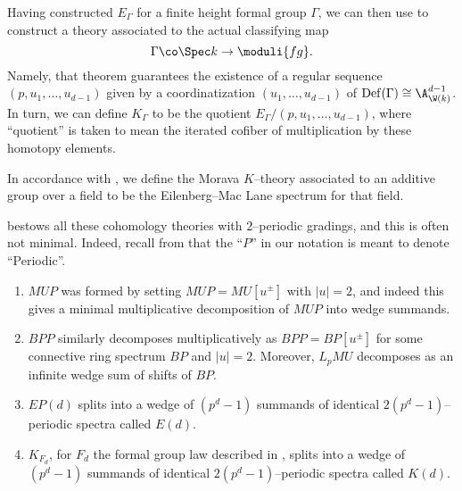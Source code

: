 \begin{example}\label{DefnKThy}
Having constructed $E_\Gamma$ for a finite height formal group $\Gamma$, we can then use  to construct a theory associated to the actual classifying map \[\Gamma \co \Spec k \to \moduli{fg}.\]  Namely, that theorem guarantees the existence of a regular sequence $(p, u_1, \ldots, u_{d-1})$ given by a coordinatization $(u_1, \ldots, u_{d-1})$ of $\operatorname{Def}(\Gamma) \cong \A^{d-1}_{\W(k)}$.  In turn, we can define $K_\Gamma$ to be the quotient $E_\Gamma / (p, u_1, \ldots, u_{d-1})$, where ``quotient'' is taken to mean the iterated cofiber of multiplication by these homotopy elements.
\end{example}

\begin{example}
In accordance with , we define the Morava $K$--theory associated to an additive group over a field to be the Eilenberg--Mac Lane spectrum for that field.
\end{example}

\begin{remark}\label{MinimalSummands}
 bestows all these cohomology theories with $2$--periodic gradings, and this is often not minimal.  Indeed, recall from  that the ``$P$'' in our notation is meant to denote ``Periodic''.
\begin{enumerate}
\item $MUP$ was formed by setting $MUP = MU[u^\pm]$ with $|u| = 2$, and indeed this gives a minimal multiplicative decomposition of $MUP$ into wedge summands.
\item $BPP$ similarly decomposes multiplicatively as $BPP = BP[u^\pm]$ for some connective ring spectrum $BP$ and $|u| = 2$.  Moreover, $L_p MU$ decomposes as an infinite wedge sum of shifts of $BP$.
\item $EP(d)$ splits into a wedge of $(p^d-1)$ summands of identical $2(p^d-1)$--periodic spectra called $E(d)$.
\item $K_{F_d}$, for $F_d$ the formal group law described in , splits into a wedge of $(p^d-1)$ summands of identical $2(p^d-1)$--periodic spectra called $K(d)$.
\end{enumerate}
\end{remark}

